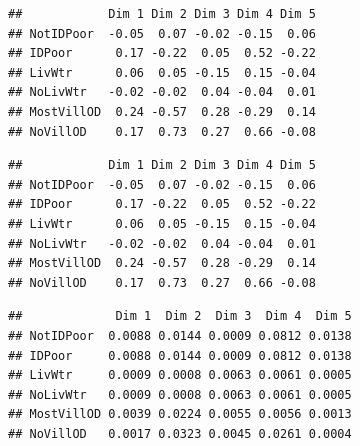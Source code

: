 \documentclass[11pt,]{article}
\newenvironment{Shaded}{\begin{snugshade}}{\end{snugshade}}
\newcommand{\DecValTok}[1]{\textcolor[rgb]{0.00,0.00,0.81}{#1}}
\newcommand{\KeywordTok}[1]{\textcolor[rgb]{0.13,0.29,0.53}{\textbf{#1}}}
\newcommand{\NormalTok}[1]{#1}
\newcommand{\OperatorTok}[1]{\textcolor[rgb]{0.81,0.36,0.00}{\textbf{#1}}}
\begin{document}
\begin{Shaded}
\end{Shaded}

\begin{verbatim}
##            Dim 1 Dim 2 Dim 3 Dim 4 Dim 5
## NotIDPoor  -0.05  0.07 -0.02 -0.15  0.06
## IDPoor      0.17 -0.22  0.05  0.52 -0.22
## LivWtr      0.06  0.05 -0.15  0.15 -0.04
## NoLivWtr   -0.02 -0.02  0.04 -0.04  0.01
## MostVillOD  0.24 -0.57  0.28 -0.29  0.14
## NoVillOD    0.17  0.73  0.27  0.66 -0.08
\end{verbatim}

\begin{Shaded}
\end{Shaded}

\begin{verbatim}
##            Dim 1 Dim 2 Dim 3 Dim 4 Dim 5
## NotIDPoor  -0.05  0.07 -0.02 -0.15  0.06
## IDPoor      0.17 -0.22  0.05  0.52 -0.22
## LivWtr      0.06  0.05 -0.15  0.15 -0.04
## NoLivWtr   -0.02 -0.02  0.04 -0.04  0.01
## MostVillOD  0.24 -0.57  0.28 -0.29  0.14
## NoVillOD    0.17  0.73  0.27  0.66 -0.08
\end{verbatim}

\begin{Shaded}
\end{Shaded}

\begin{verbatim}
##             Dim 1  Dim 2  Dim 3  Dim 4  Dim 5
## NotIDPoor  0.0088 0.0144 0.0009 0.0812 0.0138
## IDPoor     0.0088 0.0144 0.0009 0.0812 0.0138
## LivWtr     0.0009 0.0008 0.0063 0.0061 0.0005
## NoLivWtr   0.0009 0.0008 0.0063 0.0061 0.0005
## MostVillOD 0.0039 0.0224 0.0055 0.0056 0.0013
## NoVillOD   0.0017 0.0323 0.0045 0.0261 0.0004
\end{verbatim}
\end{document}
